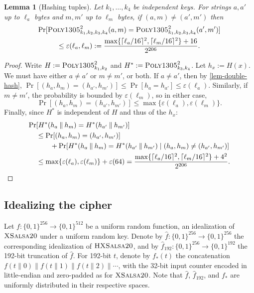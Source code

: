 \documentclass[draft]{article}
\newtheorem{lemma}{Lemma}
\def\operatorsc#1{{%
  \ifmmode\let\next=\operatorname\else\let\next=\relax\fi\next{\textsc{#1}}}}
\def\XSalsa#1/{\operatorsc{XSalsa#1}}
\def\HXSalsa#1/{\operatorsc{HXSalsa#1}}
\def\Poly#1/{\operatorsc{Poly#1}}
\newcommand{\concat}{\mathbin\|}
\newcommand{\given}{\mathrel|}
\newcommand{\collisionbound}{\varepsilon}
\begin{document}
\begin{lemma}[Hashing tuples]\label{lem-hash-tuple}
  Let $k_1, \dotsc, k_4$ be independent \Poly1305/ keys.
  For strings $a, a'$ up to $\ell_a$ bytes and $m, m'$ up to $\ell_m$
   bytes, if $(a, m) \ne (a', m')$ then
%
  \begin{multline*}
    \Pr[\Poly1305/^2_{k_1,k_2,k_3,k_4}(a, m)
        = \Poly1305/^2_{k_1,k_2,k_3,k_4}(a', m')] \\
    \leq \collisionbound(\ell_a, \ell_m)
    := \frac{\max\{\lceil\ell_a/16\rceil^2, \lceil\ell_m/16\rceil^2\}
             + 16}
            {2^{206}}.
  \end{multline*}
\end{lemma}

\begin{proof}
  Write
   $H := \Poly1305/^2_{k_1,k_2}$ and
   $H^* := \Poly1305/^2_{k_3,k_4}$.
  Let $h_x := H(x)$.
  We must have either $a \ne a'$ or $m \ne m'$, or both.
  If $a \ne a'$, then by \autoref{lem-double-hash},
   $\Pr[(h_a, h_m) = (h_{a'}, h_{m'})]
    \leq \Pr[h_a = h_{a'}]
    \leq \collisionbound(\ell_a)$.
  Similarly, if $m \ne m'$, the probability is bounded by
   $\collisionbound(\ell_m)$,
   so in either case,
  \[
    \Pr[(h_a, h_m) = (h_{a'}, h_{m'})]
    \leq \max\{\collisionbound(\ell_a), \collisionbound(\ell_m)\}.
  \]
  Finally, since $H^*$ is independent of $H$ and thus of the $h_x$:
%
  \begin{align*}
    \Pr&[H^*(h_a \concat h_m) = H^*(h_{a'} \concat h_{m'})] \\
    &\leq \Pr[(h_a, h_m) = (h_{a'}, h_{m'})] \\
    &\qquad
          + \Pr[H^*(h_a \concat h_m) = H^*(h_{a'} \concat h_{m'})
                \given (h_a, h_m) \ne (h_{a'}, h_{m'})] \\
    &\leq \max\{\collisionbound(\ell_a), \collisionbound(\ell_m)\}
          + \collisionbound(64)
     = \frac{\max\{\lceil\ell_a/16\rceil^2, \lceil\ell_m/16\rceil^2\}
             + 4^2}
            {2^{206}}.
    \qedhere
  \end{align*}
\end{proof}

\newpage

\subsection{Idealizing the cipher}

Let $f\colon \{0,1\}^{256} \to \{0,1\}^{512}$ be a uniform random
 function, an idealization of $\XSalsa20/$ under a uniform random key.
Denote by
 $\hat f\colon \{0,1\}^{256} \to \{0,1\}^{256}$
 the corresponding idealization of $\HXSalsa20/$, and by
 $\hat f_{192}\colon \{0,1\}^{256} \to \{0,1\}^{192}$
 the 192-bit truncation of $\hat f$.
For 192-bit $t$, denote by $f_*(t)$ the concatenation
 $f(t \concat 0) \concat f(t \concat 1) \concat f(t \concat 2) \concat \dotsb$,
 with the 32-bit input counter encoded in little-endian and zero-padded
 as for $\XSalsa20/$.
Note that $\hat f$, $\hat f_{192}$, and $f_*$ are uniformly
 distributed in their respective spaces.
\end{document}
